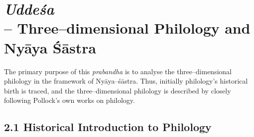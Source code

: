 
\chapter{{\it {\bfseries Uddeśa}}\\ – Three–dimensional Philology and Nyāya Śāstra}\label{chapter2}

\vspace{-.3cm}

The primary purpose of this \textit{prabandha} is to analyse the three–dimen\-sional philology in the framework of Nyāya–śāstra. Thus, initially philology’s historical birth is traced, and the three–dimensional philology is described by closely following Pollock’s own works on philology.

\vspace{-.3cm}

\section*{2.1 Historical Introduction to Philology}

\vspace{-.2cm}

